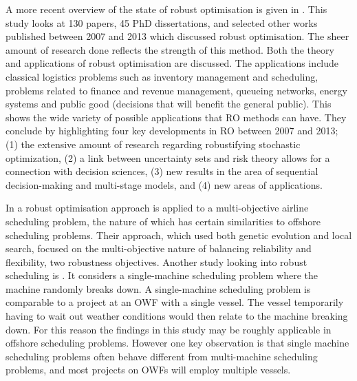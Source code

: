 \documentclass[a4paper,12pt]{article}
\begin{document}
A more recent overview of the state of robust optimisation is given in \cite{gabrel2014recent}. This study looks at 130 papers, 45 PhD dissertations, and selected other works published between 2007 and 2013 which discussed robust optimisation. The sheer amount of research done reflects the strength of this method. Both the theory and applications of robust optimisation are discussed. The applications include classical logistics problems such as inventory management and scheduling, problems related to finance and revenue management, queueing networks, energy systems and public good (decisions that will benefit the general public). This shows the wide variety of possible applications that RO methods can have. They conclude by highlighting four key developments in RO between 2007 and 2013; (1) the extensive amount of research regarding robustifying stochastic optimization, (2) a link between uncertainty sets and risk theory allows for a connection with decision sciences, (3) new results in the area of sequential decision-making and multi-stage models, and (4) new areas of applications. 

In \cite{burke2010multi} a robust optimisation approach is applied to a multi-objective airline scheduling problem, the nature of which has certain similarities to offshore scheduling problems. Their approach, which used both genetic evolution and local search, focused on the multi-objective nature of balancing reliability and flexibility, two robustness objectives. 
Another study looking into robust scheduling is \cite{goren2008robustness}. It considers a single-machine scheduling problem where the machine randomly breaks down. A single-machine scheduling problem is comparable to a project at an OWF with a single vessel. The vessel temporarily having to wait out weather conditions would then relate to the machine breaking down. For this reason the findings in this study may be roughly applicable in offshore scheduling problems. However one key observation is that single machine scheduling problems often behave different from multi-machine scheduling problems, and most projects on OWFs will employ multiple vessels. 
\end{document}
